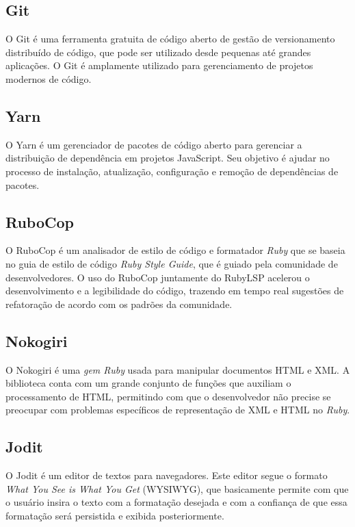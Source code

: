 \subsection {Git}

O Git é uma ferramenta gratuita de código aberto de gestão de versionamento distribuído de código, que pode ser utilizado desde pequenas até grandes aplicações. O Git é amplamente utilizado para gerenciamento de projetos modernos de código.

\subsection {Yarn}

O Yarn é um gerenciador de pacotes de código aberto para gerenciar a distribuição de dependência em projetos JavaScript. Seu objetivo é ajudar no processo de instalação, atualização, configuração e remoção de dependências de pacotes.

\subsection {RuboCop}

O RuboCop é um analisador de estilo de código e formatador \textit{Ruby} que se baseia no guia de estilo de código \textit{Ruby Style Guide}, que é guiado pela comunidade de desenvolvedores. O uso do RuboCop juntamente do RubyLSP acelerou o desenvolvimento e a legibilidade do código, trazendo em tempo real sugestões de refatoração de acordo com os padrões da comunidade.

\subsection {Nokogiri}

O Nokogiri é uma \textit{gem Ruby} usada para manipular documentos HTML e XML. A biblioteca conta com um grande conjunto de funções que auxiliam o processamento de HTML, permitindo com que o desenvolvedor não precise se preocupar com problemas específicos de representação de XML e HTML no \textit{Ruby}.

\subsection {Jodit}

O Jodit é um editor de textos para navegadores. Este editor segue o formato \textit{What You See is What You Get} (WYSIWYG), que basicamente permite com que o usuário insira o texto com a formatação desejada e com a confiança de que essa formatação será persistida e exibida posteriormente.

